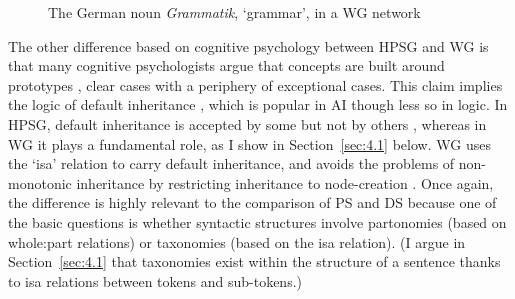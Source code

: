 \documentclass[output=paper]{langscibook}
\begin{document}
\begin{figure}
	\centering
{}
	\caption{The German noun \emph{Grammatik}, ‘grammar’, in a WG network}
	\label{fig:7}
\end{figure}

The other difference based on cognitive psychology between HPSG and WG is that many cognitive psychologists argue that concepts are built around prototypes \citep{Rosch1973,Taylor1995}, clear cases with a periphery of exceptional cases. This claim implies the logic of default inheritance \citep{BCdP93a-ed}, which is popular in AI though less so in logic. In HPSG, default inheritance is accepted by some \citep{LC99a} but not by others \citep[403]{MuellerGT-Eng2}, whereas in WG it plays a fundamental role, as I show in Section~\ref{sec:4.1} below. WG uses the ‘isa’ relation to carry default inheritance, and avoids the problems of non-monotonic inheritance by restricting inheritance to node-creation \cite[18]{Hudson2018a}. Once again, the difference is highly relevant to the comparison of PS and DS because one of the basic questions is whether syntactic structures involve partonomies (based on whole:part relations) or taxonomies (based on the isa relation). (I argue in Section~\ref{sec:4.1} that taxonomies exist within the structure of a sentence thanks to isa relations between tokens and sub-tokens.)
\end{document}
